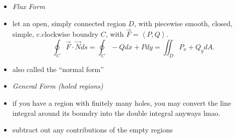 \documentclass[11pt]{article}
\theoremstyle{definition}
\begin{document}
\begin{multicols}{2}
{\begin{itemize}
      \[ \text{Area}(D)=\iint_D1dA = \frac{1}{2}\oint_C -ydx+xdy\]
      \item[] \emph{Flux Form}
      \item let an open, simply connected region $D$, with piecewise smooth, closed, simple, c.clockwise boundry $C$, with $\vec{F} = \left<P,Q\right>$.
      \[\oint_C\vec{F}\cdot\vec{N}ds = \oint_C -Qdx+Pdy = \iint_D P_x+Q_y dA.\]
      \item also called the ``normal form''
      \item[] \emph{General Form (holed regions)}
      \item if you have a region with finitely many holes, you may convert the line integral around its boundry into the double integral anyways lmao.
      \item subtract out any contributions of the empty regions
    \end{itemize}
  }
\end{multicols}
\end{document}

